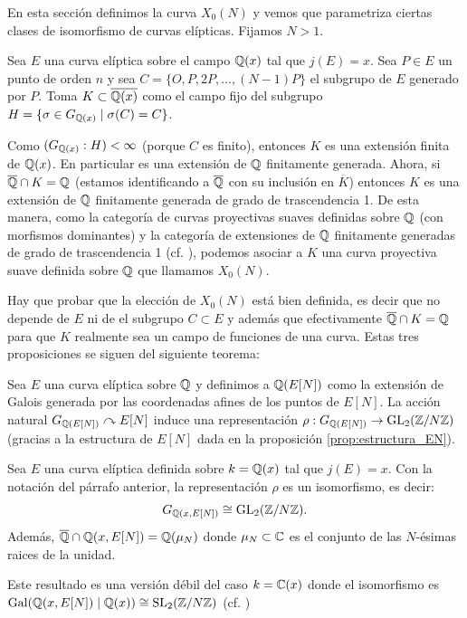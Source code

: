 \documentclass[../../tesis_maestria]{subfiles}
\begin{document}
En esta secci\'on definimos la curva $X_0(N)$ y vemos que parametriza ciertas clases de
isomorfismo de curvas el\'ipticas. Fijamos $N>1$.

Sea $E$ una curva el\'iptica sobre el campo $\mathbb{Q}(x)$ tal que $j(E)=x$. Sea $P\in E$ un punto de
orden $n$ y sea $C=\{O,P,2P,\ldots,(N-1)P\}$ el subgrupo de $E$ generado por $P$. Toma
$K\subset\overline{\mathbb{Q}(x)}$ como el campo fijo del subgrupo
$H=\{\sigma\in G_{\mathbb{Q}(x)}\mid \sigma(C)=C\}$.

Como $(G_{\mathbb{Q}(x)}:H)<\infty$ (porque $C$ es finito), entonces $K$ es una extensi\'on finita
de $\mathbb{Q}(x)$. En particular es una extensi\'on de $\mathbb{Q}$ finitamente generada. Ahora, si
$\overline{\mathbb{Q}}\cap K=\mathbb{Q}$ (estamos identificando a $\overline{\mathbb{Q}}$ con su inclusi\'on en
$\overline{K}$) entonces $K$ es una extensi\'on de $\mathbb{Q}$ finitamente generada de grado de
trascendencia 1. De esta manera, como la categor\'ia de curvas proyectivas suaves definidas
sobre $\mathbb{Q}$ (con morfismos dominantes) y la categor\'ia de extensiones de $\mathbb{Q}$ finitamente
generadas de grado de trascendencia 1 (cf. \cite[\S1.6, corolario 6.12]{HartshorneAG}), podemos
asociar a $K$ una curva proyectiva suave definida sobre $\mathbb{Q}$ que llamamos $X_0(N)$.

Hay que probar que la elecci\'on de $X_0(N)$ est\'a bien definida, es decir que no depende de
$E$ ni de el subgrupo $C\subset E$ y adem\'as que efectivamente $\overline{\mathbb{Q}}\cap K=\mathbb{Q}$ para que
$K$ realmente sea un campo de funciones de una curva. Estas tres proposiciones se siguen del
siguiente teorema:

Sea $E$ una curva el\'iptica sobre $\mathbb{Q}$ y definimos a $\mathbb{Q}(E[N])$ como la extensi\'on de
Galois generada por las coordenadas afines de los puntos de $E[N]$. La acci\'on natural
$G_{\mathbb{Q}(E[N])}\curvearrowright E[N]$ induce una representaci\'on
$\rho:G_{\mathbb{Q}(E[N])}\rightarrow\mathrm{GL}_{2}(\mathbb{Z}/N\mathbb{Z})$ (gracias a la estructura de $E[N]$ dada en la proposici\'on
\ref{prop:estructura_EN}).

\begin{thm}\label{thm:iso_gruposgalois}
  Sea $E$ una curva el\'iptica definida sobre $k=\mathbb{Q}(x)$ tal que $j(E)=x$. Con la notaci\'on del
  p\'arrafo anterior, la representaci\'on $\rho$ es un isomorfismo, es decir:
  \[
    G_{\mathbb{Q}(x,E[N])}\cong\mathrm{GL}_{2}(\mathbb{Z}/N\mathbb{Z}).
  \]
  Adem\'as, $\overline{\mathbb{Q}}\cap\mathbb{Q}(x,E[N])=\mathbb{Q}(\mu_N)$ donde $\mu_N\subset\mathbb{C}$
  es el conjunto de las $N$-\'esimas raices de la unidad.
\end{thm}

\begin{nota}
  Este resultado es una versi\'on d\'ebil del caso $k=\mathbb{C}(x)$ donde el isomorfismo es
  $\mathrm{Gal}(\mathbb{Q}(x,E[N])\mid\mathbb{Q}(x))\cong\mathrm{SL}_{2}(\mathbb{Z}/N\mathbb{Z})$ (cf.
  \cite[cap\'itulo III, \S1, teorema 1 y su corolario]{CornellMFAFLT})
\end{nota}
\end{document}
